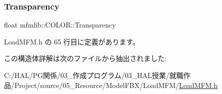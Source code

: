 \subsubsection{\texorpdfstring{Transparency}{Transparency}}
{\footnotesize\ttfamily float mfmlib\+::\+C\+O\+L\+O\+R\+::\+Transparency}



 Load\+M\+F\+M.\+h の 65 行目に定義があります。



この構造体詳解は次のファイルから抽出されました\+:\begin{DoxyCompactItemize}
\item 
C\+:/\+H\+A\+L/\+P\+G関係/03\+\_\+作成プログラム/03\+\_\+\+H\+A\+L授業/就職作品/\+Project/source/05\+\_\+\+Resource/\+Model\+F\+B\+X/\+Load\+M\+F\+M/\mbox{\hyperlink{_load_m_f_m_8h}{Load\+M\+F\+M.\+h}}\end{DoxyCompactItemize}
